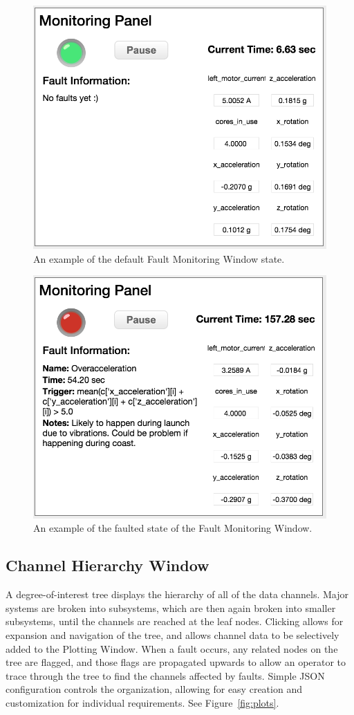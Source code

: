 \documentclass[letterpaper, 10 pt, conference]{ieeeconf}  %
\begin{document}
\begin{figure}[h]
\centering
    \includegraphics[width=0.6\columnwidth]{monitor12.png}
    \caption{An example of the default Fault Monitoring Window state.}
    \label{fig:monitor1}
\end{figure}

\begin{figure}[h]
\centering
    \includegraphics[width=0.6\columnwidth]{monitor22.png}
    \caption{An example of the faulted state of the Fault Monitoring Window.}
    \label{fig:monitor2}
\end{figure}

\subsection{Channel Hierarchy Window}

A degree-of-interest tree displays the hierarchy of all of the data channels. Major systems are broken into subsystems, which are then again broken into smaller subsystems, until the channels are reached at the leaf nodes. Clicking allows for expansion and navigation of the tree, and allows channel data to be selectively added to the Plotting Window. When a fault occurs, any related nodes on the tree are flagged, and those flags are propagated upwards to allow an operator to trace through the tree to find the channels affected by faults. Simple JSON configuration controls the organization, allowing for easy creation and customization for individual requirements. See Figure~\ref{fig:plots}.
\end{document}
